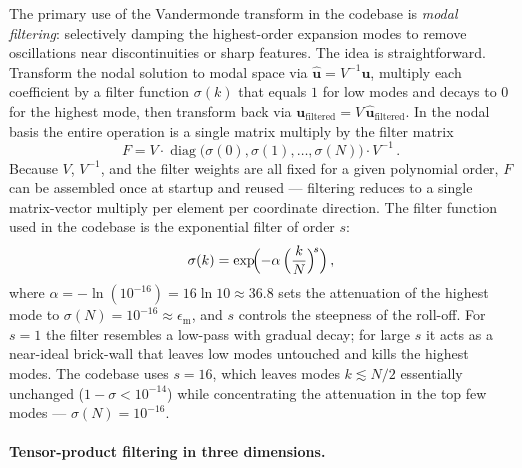 The primary use of the Vandermonde transform in the codebase is
\emph{modal filtering}: selectively damping the highest-order
expansion modes to remove oscillations near discontinuities or sharp
features.  The idea is straightforward.  Transform the nodal
solution to modal space via $\hat{\mathbf{u}} = V^{-1}\mathbf{u}$,
multiply each coefficient by a filter function $\sigma(k)$ that
equals $1$ for low modes and decays to $0$ for the highest mode,
then transform back via $\mathbf{u}_{\text{filtered}} =
V\,\hat{\mathbf{u}}_{\text{filtered}}$.  In the nodal basis the
entire operation is a single matrix multiply by the filter matrix
%
\begin{equation}
  F = V \cdot \operatorname{diag}\bigl(\sigma(0), \sigma(1),
    \ldots, \sigma(N)\bigr) \cdot V^{-1} \,.
  \label{eq:filter-matrix}
\end{equation}
%
Because $V$, $V^{-1}$, and the filter weights are all fixed for a
given polynomial order, $F$ can be assembled once at startup and
reused --- filtering reduces to a single matrix-vector multiply per
element per coordinate direction.  The filter function used in the
codebase is the exponential filter of order $s$:
%
\begin{equation}
  \sigma(k) = \exp\!\Bigl(-\alpha\,\Bigl(\frac{k}{N}\Bigr)^{\!s}\Bigr) \,,
  \label{eq:exponential-filter}
\end{equation}
%
where $\alpha = -\ln(10^{-16}) = 16\ln 10 \approx 36.8$ sets the
attenuation of the highest mode to $\sigma(N) = 10^{-16} \approx
\epsilon_{\text{m}}$, and $s$ controls the steepness of the roll-off.
For $s = 1$ the filter resembles a low-pass with gradual decay; for
large $s$ it acts as a near-ideal brick-wall that leaves low modes
untouched and kills the highest modes.  The codebase uses $s = 16$,
which leaves modes $k \lesssim N/2$ essentially unchanged
($1 - \sigma < 10^{-14}$) while concentrating the attenuation in
the top few modes --- $\sigma(N) = 10^{-16}$.

\paragraph{Tensor-product filtering in three dimensions.}

